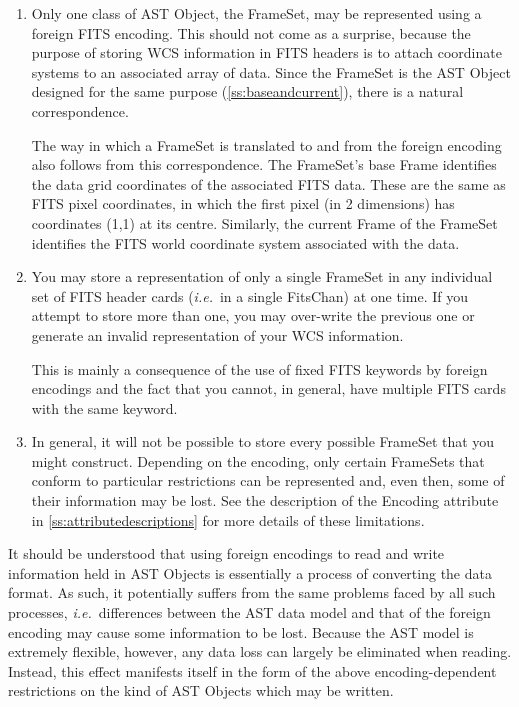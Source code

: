 \documentclass[twoside,11pt]{article}
\newcommand{\htmlref}[2]{#1}
\newcommand{\appref}[1]{Appendix~\ref{#1}}
\newcommand{\secref}[1]{\S\ref{#1}}
\renewcommand{\appref}[1]{\ref{#1}}
\renewcommand{\secref}[1]{\ref{#1}}
\begin{document}
\begin{enumerate}
\item Only one class of AST \htmlref{Object}{Object}, the \htmlref{FrameSet}{FrameSet}, may be represented
using a foreign FITS encoding. This should not come as a surprise,
because the purpose of storing WCS information in FITS headers is to
attach coordinate systems to an associated array of data. Since the
FrameSet is the AST Object designed for the same purpose
(\secref{ss:baseandcurrent}), there is a natural correspondence.

The way in which a FrameSet is translated to and from the foreign
encoding also follows from this correspondence. The FrameSet's base
\htmlref{Frame}{Frame} identifies the data grid coordinates of the associated FITS
data. These are the same as FITS pixel coordinates, in which the first
pixel (in 2 dimensions) has coordinates (1,1) at its
centre. Similarly, the current Frame of the FrameSet identifies the
FITS world coordinate system associated with the data.

\item You may store a representation of only a single FrameSet in any
individual set of FITS header cards ({\em{i.e.}}\ in a single
\htmlref{FitsChan}{FitsChan}) at one time. If you attempt to store more than one, you may
over-write the previous one or generate an invalid representation of
your WCS information.

This is mainly a consequence of the use of fixed FITS keywords by
foreign encodings and the fact that you cannot, in general, have
multiple FITS cards with the same keyword.

\item In general, it will not be possible to store every possible
FrameSet that you might construct. Depending on the encoding, only
certain FrameSets that conform to particular restrictions can be
represented and, even then, some of their information may be lost. See
the description of the \htmlref{Encoding}{Encoding} attribute in
\appref{ss:attributedescriptions} for more details of these
limitations.
\end{enumerate}

It should be understood that using foreign encodings to read and write
information held in AST Objects is essentially a process of converting
the data format. As such, it potentially suffers from the same
problems faced by all such processes, {\em{i.e.}}\ differences between
the AST data model and that of the foreign encoding may cause some
information to be lost.  Because the AST model is extremely flexible,
however, any data loss can largely be eliminated when reading.
Instead, this effect manifests itself in the form of the above
encoding-dependent restrictions on the kind of AST Objects which may
be written.
\end{document}
